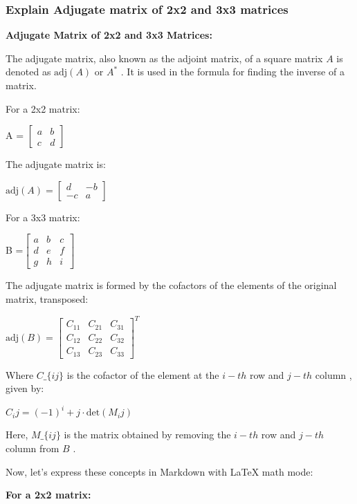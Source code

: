\documentclass[11pt]{article}
\begin{document}
    \hypertarget{explain-adjugate-matrix-of-2x2-and-3x3-matrices}{%
\subsubsection{Explain Adjugate matrix of 2x2 and 3x3
matrices}\label{explain-adjugate-matrix-of-2x2-and-3x3-matrices}}

    \textbf{Adjugate Matrix of 2x2 and 3x3 Matrices:}

The adjugate matrix, also known as the adjoint matrix, of a square
matrix $  A $ is denoted as $  \text{adj}(A) $ or $  A^*$ . It is used in
the formula for finding the inverse of a matrix.

For a 2x2 matrix:

A = $\begin{bmatrix} a & b \\ c & d \end{bmatrix}$

The adjugate matrix is:

$  \text{adj}(A) =\begin{bmatrix} d & -b \\ -c & a \end{bmatrix}$ 

For a 3x3 matrix:

B =$\begin{bmatrix} a & b & c \\ d & e & f \\ g & h & i \end{bmatrix}$

The adjugate matrix is formed by the cofactors of the elements of the
original matrix, transposed:

$ \text{adj}(B) =\begin{bmatrix} C_{11} & C_{21} & C_{31} \\ C_{12} & C_{22} & C_{32} \\ C_{13} & C_{23} & C_{33} \end{bmatrix}^T $

Where $  C\_\{ij\} $  is the cofactor of the element at the $  i-th $ 
row and $  j-th$  column , given by:

$ C_ij = (-1)^i+j \cdot \text{det}(M_ij) $

Here, $  M\_\{ij\} $  is the matrix obtained by removing the $  i-th $ 
row and $  j-th $  column from $  B $ .

Now, let's express these concepts in Markdown with LaTeX math mode:

\textbf{For a 2x2 matrix:}
\end{document}
